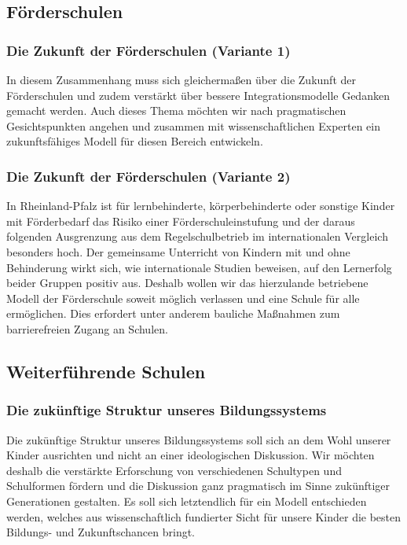 \newpage
\subsection*{Förderschulen}

\subsubsection{Die Zukunft der Förderschulen (Variante 1)}
\abstimmung
In diesem Zusammenhang muss sich gleichermaßen über die Zukunft der Förderschulen und zudem verstärkt über bessere Integrationsmodelle Gedanken gemacht werden. Auch dieses Thema möchten wir nach pragmatischen Gesichtspunkten angehen und zusammen mit wissenschaftlichen Experten ein zukunftsfähiges Modell für diesen Bereich entwickeln.

\subsubsection{Die Zukunft der Förderschulen (Variante 2)}
\abstimmung
In Rheinland-Pfalz ist für lernbehinderte, körperbehinderte oder sonstige Kinder mit Förderbedarf das Risiko einer Förderschuleinstufung und der daraus folgenden Ausgrenzung aus dem Regelschulbetrieb im internationalen Vergleich besonders hoch. Der gemeinsame Unterricht von Kindern mit und ohne Behinderung wirkt sich, wie internationale Studien beweisen, auf den Lernerfolg beider Gruppen positiv aus. Deshalb wollen wir das hierzulande betriebene Modell der Förderschule soweit möglich verlassen und eine Schule für alle ermöglichen. Dies erfordert unter anderem bauliche Maßnahmen zum barrierefreien Zugang an Schulen.
 
\subsection*{Weiterführende Schulen}
\label{wp:bildung:struktur}

\subsubsection{Die zukünftige Struktur unseres Bildungssystems}
\abstimmung
Die zukünftige Struktur unseres Bildungssystems soll sich an dem Wohl unserer Kinder ausrichten und nicht an einer ideologischen Diskussion. Wir möchten deshalb die verstärkte Erforschung von verschiedenen Schultypen und Schulformen fördern und die Diskussion ganz pragmatisch im Sinne zukünftiger Generationen gestalten. Es soll sich letztendlich für ein Modell entschieden werden, welches aus wissenschaftlich fundierter Sicht für unsere Kinder die besten Bildungs- und Zukunftschancen bringt.
 
